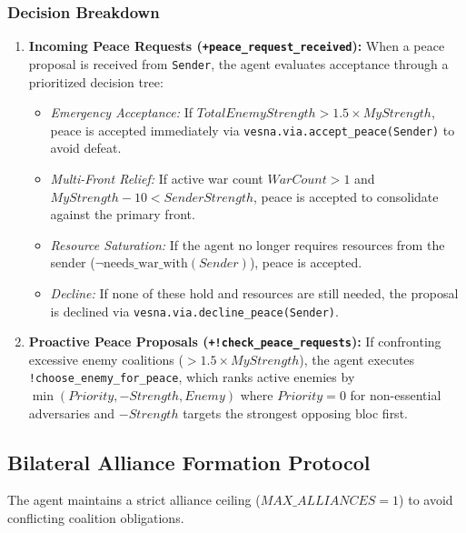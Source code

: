 \subsubsection{Decision Breakdown}
\begin{enumerate}[label=\alph*)]
    \item \textbf{Incoming Peace Requests (\texttt{+peace\_request\_received}):} When a peace proposal is received from \texttt{Sender}, the agent evaluates acceptance through a prioritized decision tree:
    \begin{itemize}
        \item \textit{Emergency Acceptance:} If $\mathit{TotalEnemyStrength} > 1.5 \times \mathit{MyStrength}$, peace is accepted immediately via \texttt{vesna.via.accept\_peace(Sender)} to avoid defeat.
        \item \textit{Multi-Front Relief:} If active war count $\mathit{WarCount} > 1$ and $\mathit{MyStrength} - 10 < \mathit{SenderStrength}$, peace is accepted to consolidate against the primary front.
        \item \textit{Resource Saturation:} If the agent no longer requires resources from the sender ($\neg \text{needs\_war\_with}(\mathit{Sender})$), peace is accepted.
        \item \textit{Decline:} If none of these hold and resources are still needed, the proposal is declined via \texttt{vesna.via.decline\_peace(Sender)}.
    \end{itemize}
    \item \textbf{Proactive Peace Proposals (\texttt{+!check\_peace\_requests}):} If confronting excessive enemy coalitions ($> 1.5 \times \mathit{MyStrength}$), the agent executes \texttt{!choose\_enemy\_for\_peace}, which ranks active enemies by $\min(\mathit{Priority}, -\mathit{Strength}, \mathit{Enemy})$ where $\mathit{Priority} = 0$ for non-essential adversaries and $-\mathit{Strength}$ targets the strongest opposing bloc first.
\end{enumerate}

\subsection{Bilateral Alliance Formation Protocol}
\label{subsec:alliance_formation}

The agent maintains a strict alliance ceiling ($\mathit{MAX\_ALLIANCES} = 1$) to avoid conflicting coalition obligations.

